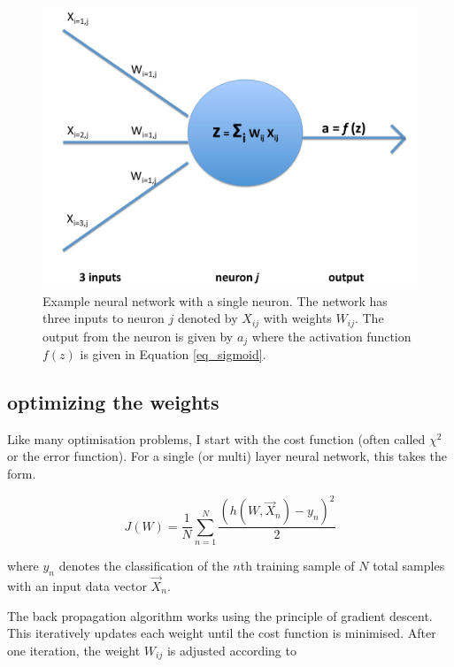 \documentclass[10pt]{article}
\begin{document}
\begin{figure}
\includegraphics[scale=0.5,angle=0,trim=0cm 0cm 0.0cm 0cm]{diagrams.pdf}
\caption{Example neural network with a single neuron. The network has three inputs to neuron $j$ denoted by $X_{ij}$ with weights $W_{ij}$. The output from the neuron is given by $a_j$ where the activation function $f(z)$ is given in Equation \ref{eq_sigmoid}.}
\label{fig_temp}
\end{figure}


\subsection{optimizing the weights}

Like many optimisation problems, I start with the cost function (often called $\chi^2$ or the error function). For a single (or multi) layer neural network, this takes the form.

\begin{equation}
J(W) = \frac{1}{N} \sum_{n=1}^N \frac{ \left( h(W,\vec{X}_n) - y_n \right)^2} {2}
\label{eq_cost}
\end{equation}

\noindent where $y_n$ denotes the classification of the $n$th training sample of $N$ total samples with an input data vector $\vec{X}_n$.



The back propagation algorithm works using the principle of gradient descent. This iteratively updates each weight until the cost function is minimised. After one iteration, the weight $W_{ij}$ is adjusted according to 
\end{document}
